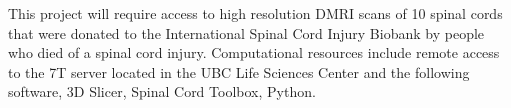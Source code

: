 This project will require access to high resolution DMRI scans of 10 spinal cords that were donated to the International Spinal Cord Injury Biobank by people who died of a spinal cord injury. Computational resources include remote access to the 7T server located in the UBC Life Sciences Center and the following software, 3D Slicer, Spinal Cord Toolbox, Python.